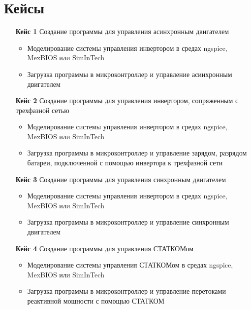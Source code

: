 \section{Кейсы}
\begin{itemize}
\item[\bf{Кейс 1}] Создание программы для управления асинхронным двигателем
        \begin{itemize}
           \item Моделирование системы управления инвертором в средах ngspice, MexBIOS или SimInTech
           \item Загрузка программы в микроконтроллер и управление асинхронным двигателем
        \end{itemize}

\item[\bf{Кейс 2}] Создание программы для управления инвертором, сопряженным с трехфазной сетью
       \begin{itemize}
         \item Моделирование системы управления инвертором в средах ngspice, MexBIOS или SimInTech
         \item Загрузка программы в микроконтроллер и управление зарядом, разрядом батареи, подключенной с помощью инвертора к трехфазной сети
      \end{itemize}

\item[\bf{Кейс 3}] Создание программы для управления синхронным двигателем
       \begin{itemize}
           \item Моделирование системы управления инвертором в средах ngspice, MexBIOS или SimInTech
           \item Загрузка программы в микроконтроллер и управление синхронным двигателем
        \end{itemize}

\item[\bf{Кейс 4}]  Создание программы для управления СТАТКОМом
      \begin{itemize}
         \item Моделирование системы управления СТАТКОМом в средах ngspice, MexBIOS или SimInTech
         \item Загрузка программы в микроконтроллер и управление перетоками реактивной мощности с помощью СТАТКОМ
      \end{itemize}

\end{itemize}

